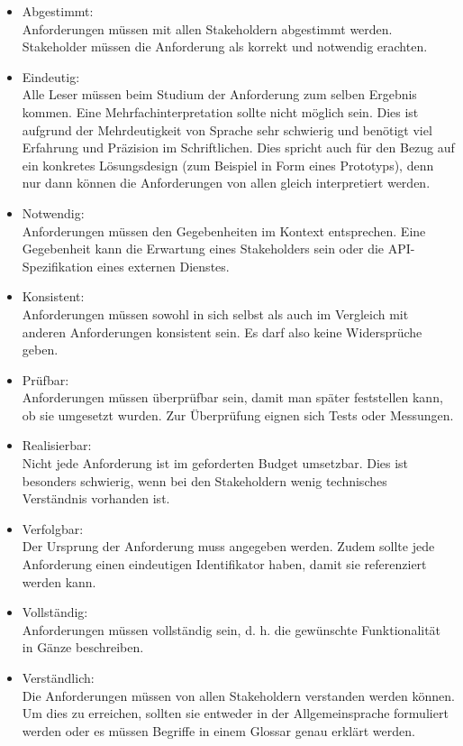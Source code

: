 \documentclass[a4paper, ngerman, 12pt, usenames, dvipsnames]{article}
\begin{document}
\begin{itemize}
\item Abgestimmt:\\
Anforderungen müssen mit allen Stakeholdern abgestimmt werden. Stakeholder müssen die Anforderung als korrekt und notwendig erachten.
\item Eindeutig:\\
Alle Leser müssen beim Studium der Anforderung zum selben Ergebnis kommen. Eine Mehrfachinterpretation sollte nicht möglich sein. Dies ist aufgrund der Mehrdeutigkeit von Sprache sehr schwierig und benötigt viel Erfahrung und Präzision im Schriftlichen. Dies spricht auch für den Bezug auf ein konkretes Lösungsdesign (zum Beispiel in Form eines Prototyps), denn nur dann können die Anforderungen von allen gleich interpretiert werden.
\item Notwendig:\\
Anforderungen müssen den Gegebenheiten im Kontext entsprechen. Eine Gegebenheit kann die Erwartung eines Stakeholders sein oder die API-Spezifikation eines externen Dienstes.
\item Konsistent:\\
Anforderungen müssen sowohl in sich selbst als auch im Vergleich mit anderen Anforderungen konsistent sein. Es darf also keine Widersprüche geben.
\item Prüfbar:\\
Anforderungen müssen überprüfbar sein, damit man später feststellen kann, ob sie umgesetzt wurden. Zur Überprüfung eignen sich Tests oder Messungen.
\item Realisierbar:\\
Nicht jede Anforderung ist im geforderten Budget umsetzbar. Dies ist besonders schwierig, wenn bei den Stakeholdern wenig technisches Verständnis vorhanden ist.
\item Verfolgbar:\\
Der Ursprung der Anforderung muss angegeben werden. Zudem sollte jede Anforderung einen eindeutigen Identifikator haben, damit sie referenziert werden kann.
\item Vollständig:\\
Anforderungen müssen vollständig sein, d. h. die gewünschte Funktionalität in Gänze beschreiben.
\item Verständlich:\\
Die Anforderungen müssen von allen Stakeholdern verstanden werden können. Um dies zu erreichen, sollten sie entweder in der Allgemeinsprache formuliert werden oder es müssen Begriffe in einem Glossar genau erklärt werden.
\end{itemize}
\end{document}
